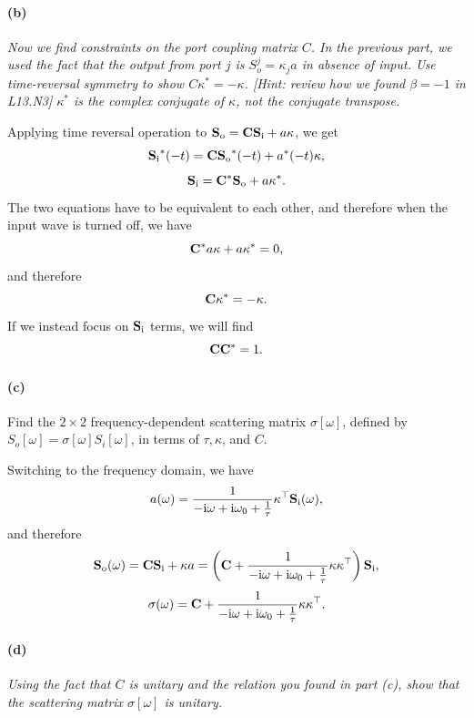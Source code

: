 \documentclass[hyperref, a4paper]{article}
\newcommand*{\ii}{\mathrm{i}}
\newcommand*{\Si}[1]{S_{\text{i#1}}}
\newcommand*{\So}[1]{S_{\text{o#1}}}
\begin{document}
\paragraph*{(b)} \textit{Now we find constraints on the port coupling matrix $C$. In the previous part, we used the fact that the output from port $j$ is $S_o^j=\kappa_j a$ in absence of input. Use time-reversal symmetry to show $C \kappa^*=-\kappa$. [Hint: review how we found $\beta=-1$ in L13.N3] $\kappa^*$ is the complex conjugate of $\kappa$, not the conjugate transpose.} 

Applying time reversal operation to $\vb{\So{}} = \vb{C} \vb{\Si{}} + a \vb{\kappa}$, we get 
\[
    \vb{\Si{}}^*(-t) = \vb{C} \vb{\So{}}^*(-t) + a^*(-t) \vb{\kappa},
\]
\begin{equation}
    \vb{\Si{}} = \vb{C}^* \vb{\So{}} + a \vb{\kappa}^*.
\end{equation}
The two equations have to be equivalent to each other, 
and therefore when the input wave is turned off, we have 
\[ 
    \vb{C}^* a \kappa + a \kappa^* = 0,
\]
and therefore
\begin{equation}
    \vb{C} \vb{\kappa}^* = - \vb{\kappa}.
\end{equation}
If we instead focus on $\vb{\Si{}}$ terms, we will find 
\begin{equation}
    \vb{C} \vb{C}^* = 1.
\end{equation}

\paragraph*{(c)} Find the $2 \times 2$ frequency-dependent scattering matrix $\sigma[\omega]$, defined by $S_o[\omega]=\sigma[\omega] S_i[\omega]$, in terms of $\tau, \kappa$, and $C$.

Switching to the frequency domain, we have 
\[
    a(\omega) = \frac{1}{- \ii \omega + \ii \omega_0 + \frac{1}{\tau}} \vb{\kappa}^\top \vb{\Si{}}(\omega),
\]
and therefore 
\[
    \vb{\So{}}(\omega) = \vb{C} \vb{\Si{}} + \vb{\kappa} a 
    = \left(
        \vb{C} + \frac{1}{- \ii \omega + \ii \omega_0 + \frac{1}{\tau}} \vb{\kappa} \vb{\kappa}^\top 
    \right) \vb{\Si{}} ,
\]
\begin{equation}
    \vb{\sigma}(\omega) = \vb{C} + \frac{1}{- \ii \omega + \ii \omega_0 + \frac{1}{\tau}} \vb{\kappa} \vb{\kappa}^\top .
\end{equation}

\paragraph*{(d)} \textit{Using the fact that $C$ is unitary and the relation you found in part (c), show that the scattering matrix $\sigma[\omega]$ is unitary.} 
\end{document}
